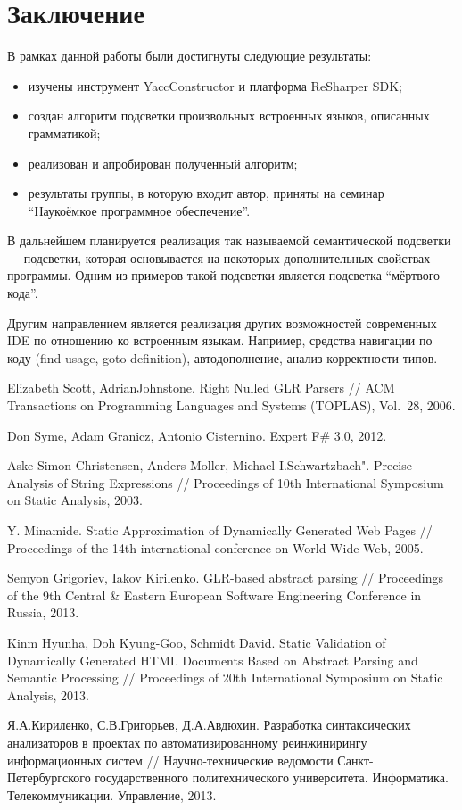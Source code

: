 \section*{Заключение}

В рамках данной работы были достигнуты следующие результаты:
\begin{itemize}
\item изучены инструмент YaccConstructor и платформа ReSharper SDK;
\item создан алгоритм подсветки произвольных встроенных языков, описанных грамматикой;
\item реализован и апробирован полученный алгоритм;
\item результаты группы, в которую входит автор, приняты на семинар ``Наукоёмкое программное обеспечение''.
\end{itemize}

В дальнейшем планируется реализация так называемой семантической подсветки --- подсветки, которая основывается на некоторых дополнительных свойствах программы. Одним из примеров такой подсветки является подсветка ``мёртвого кода''. 

Другим направлением является реализация других возможностей современных IDE по отношению ко встроенным языкам. Например, средства навигации по коду (find usage, goto definition), автодополнение, анализ корректности типов. 

\begin{thebibliography}{99}
Elizabeth Scott, AdrianJohnstone.
Right Nulled GLR Parsers //
ACM Transactions on Programming Languages and Systems (TOPLAS), Vol.~28, 2006.

Don Syme, Adam Granicz, Antonio Cisternino.
Expert F\# 3.0, 2012.

Aske Simon Christensen, Anders Moller, Michael I.Schwartzbach".
Precise Analysis of String Expressions //
Proceedings of 10th International Symposium on Static Analysis, 2003.

Y. Minamide. Static Approximation of Dynamically Generated Web Pages //
Proceedings of the 14th international conference on World Wide Web, 2005.

Semyon Grigoriev, Iakov Kirilenko. GLR-based abstract parsing //
Proceedings of the 9th Central \& Eastern European Software Engineering Conference in Russia, 2013.

Kinm Hyunha, Doh Kyung-Goo, Schmidt David.
Static Validation of Dynamically Generated HTML Documents Based on Abstract Parsing and Semantic Processing //
Proceedings of 20th International Symposium on Static Analysis, 2013.

Я.А.Кириленко, С.В.Григорьев, Д.А.Авдюхин.
Разработка синтаксических анализаторов в проектах по автоматизированному реинжинирингу информационных систем //
Научно-технические ведомости Санкт-Петербургского государственного политехнического университета. Информатика. Телекоммуникации. Управление, 2013.
\end{thebibliography}
